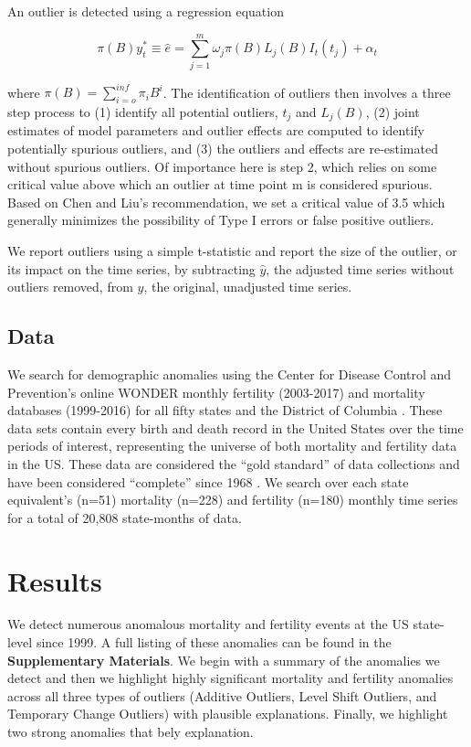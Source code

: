 \documentclass[12pt]{article}
\begin{document}
An outlier is detected using a regression equation

\[ \pi(B)y_t^* \equiv \hat{e} = \sum_{j=1}^m \omega_j \pi(B)L_j(B)I_t(t_j) + \alpha_t \]

where \(\pi(B)=\sum_{i=o}^{inf} \pi_iB^i\). The identification of
outliers then involves a three step process to (1) identify all
potential outliers, \(t_j\) and \(L_j (B)\), (2) joint estimates of
model parameters and outlier effects are computed to identify
potentially spurious outliers, and (3) the outliers and effects are
re-estimated without spurious outliers. Of importance here is step 2,
which relies on some critical value above which an outlier at time point
m is considered spurious. Based on Chen and Liu's
\citeyearpar{chen1993joint} recommendation, we set a critical value of
3.5 which generally minimizes the possibility of Type I errors or false
positive outliers.

We report outliers using a simple t-statistic and report the size of the
outlier, or its impact on the time series, by subtracting \(\hat{y}\),
the adjusted time series without outliers removed, from \(y\), the
original, unadjusted time series.

\hypertarget{data}{%
\subsection{Data}\label{data}}

We search for demographic anomalies using the Center for Disease Control
and Prevention's online WONDER monthly fertility (2003-2017) and
mortality databases (1999-2016) for all fifty states and the District of
Columbia \citep{CDC_fert07, CDC_mort}. These data sets contain every
birth and death record in the United States over the time periods of
interest, representing the universe of both mortality and fertility data
in the US. These data are considered the ``gold standard'' of data
collections \citep{mahapatra2007civil} and have been considered
``complete'' since 1968 \citep{hetzel2016us}. We search over each state
equivalent's (n=51) mortality (n=228) and fertility (n=180) monthly time
series for a total of 20,808 state-months of data.

\hypertarget{results}{%
\section{Results}\label{results}}

We detect numerous anomalous mortality and fertility events at the US
state-level since 1999. A full listing of these anomalies can be found
in the \textbf{Supplementary Materials}. We begin with a summary of the
anomalies we detect and then we highlight highly significant mortality
and fertility anomalies across all three types of outliers (Additive
Outliers, Level Shift Outliers, and Temporary Change Outliers) with
plausible explanations. Finally, we highlight two strong anomalies that
bely explanation.
\end{document}
